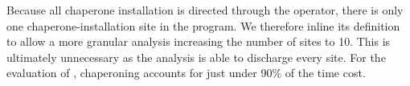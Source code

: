 Because all chaperone installation is directed through the \scheme{->} operator, there is only one chaperone-installation site in the program.
We therefore inline its definition to allow a more granular analysis increasing the number of sites to 10.
This is ultimately unnecessary as the analysis is able to discharge every site.
For the evaluation of , chaperoning accounts for just under 90\% of the time cost.





